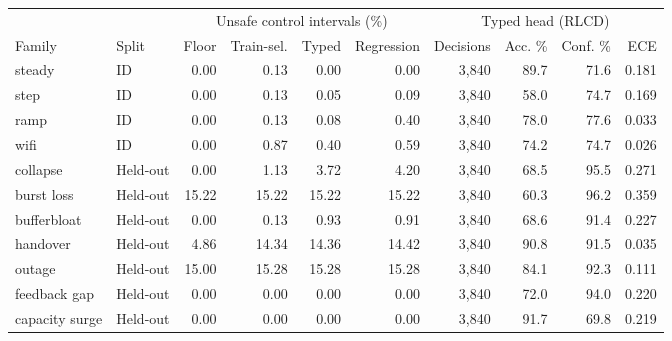 \begin{tabular}{llrrrrrrrr}
\toprule
 & & \multicolumn{4}{c}{Unsafe control intervals (\%)} & \multicolumn{4}{c}{Typed head (RLCD)} \\
Family & Split & Floor & Train-sel. & Typed & Regression & Decisions & Acc. \% & Conf. \% & ECE \\
\midrule
steady & ID & 0.00 & 0.13 & 0.00 & 0.00 & 3{,}840 & 89.7 & 71.6 & 0.181 \\
step & ID & 0.00 & 0.13 & 0.05 & 0.09 & 3{,}840 & 58.0 & 74.7 & 0.169 \\
ramp & ID & 0.00 & 0.13 & 0.08 & 0.40 & 3{,}840 & 78.0 & 77.6 & 0.033 \\
wifi & ID & 0.00 & 0.87 & 0.40 & 0.59 & 3{,}840 & 74.2 & 74.7 & 0.026 \\
collapse & Held-out & 0.00 & 1.13 & 3.72 & 4.20 & 3{,}840 & 68.5 & 95.5 & 0.271 \\
burst loss & Held-out & 15.22 & 15.22 & 15.22 & 15.22 & 3{,}840 & 60.3 & 96.2 & 0.359 \\
bufferbloat & Held-out & 0.00 & 0.13 & 0.93 & 0.91 & 3{,}840 & 68.6 & 91.4 & 0.227 \\
handover & Held-out & 4.86 & 14.34 & 14.36 & 14.42 & 3{,}840 & 90.8 & 91.5 & 0.035 \\
outage & Held-out & 15.00 & 15.28 & 15.28 & 15.28 & 3{,}840 & 84.1 & 92.3 & 0.111 \\
feedback gap & Held-out & 0.00 & 0.00 & 0.00 & 0.00 & 3{,}840 & 72.0 & 94.0 & 0.220 \\
capacity surge & Held-out & 0.00 & 0.00 & 0.00 & 0.00 & 3{,}840 & 91.7 & 69.8 & 0.219 \\
\bottomrule
\end{tabular}
